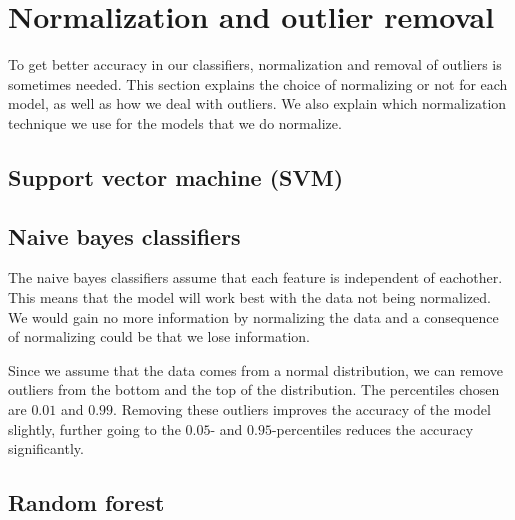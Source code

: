 \section{Normalization and outlier removal}

To get better accuracy in our classifiers, normalization and removal of outliers is sometimes needed. This section explains the choice of normalizing or not for each model, as well as how we deal with outliers. We also explain which normalization technique we use for the models that we do normalize. 

\subsection{Support vector machine (SVM)}

\subsection{Naive bayes classifiers}

The naive bayes classifiers assume that each feature is independent of eachother. This means that the model will work best with the data not being normalized. We would gain no more information by normalizing the data and a consequence of normalizing could be that we lose information.
\par
Since we assume that the data comes from a normal distribution, we can remove outliers from the bottom and the top of the distribution. The percentiles chosen are $0.01$ and $0.99$. Removing these outliers improves the accuracy of the model slightly, further going to the $0.05$- and $0.95$-percentiles reduces the accuracy significantly.

\subsection{Random forest}